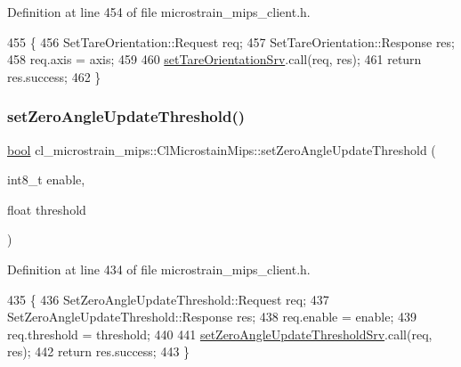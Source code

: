 Definition at line 454 of file microstrain\+\_\+mips\+\_\+client.\+h.


\begin{DoxyCode}
455     \{
456         SetTareOrientation::Request req;
457         SetTareOrientation::Response res;
458         req.axis = axis;
459 
460         \hyperlink{classcl__microstrain__mips_1_1ClMicrostainMips_affd28a64d0ee9bcdb116d974f5e19ec6}{setTareOrientationSrv}.call(req, res);
461         \textcolor{keywordflow}{return} res.success;
462     \}
\end{DoxyCode}
\mbox{\label{classcl__microstrain__mips_1_1ClMicrostainMips_a75ba5fe4116ece2f23f9f92f7ab96435}} 
\subsubsection{\texorpdfstring{set\+Zero\+Angle\+Update\+Threshold()}{setZeroAngleUpdateThreshold()}}
{\footnotesize\ttfamily \hyperlink{classbool}{bool} cl\+\_\+microstrain\+\_\+mips\+::\+Cl\+Microstain\+Mips\+::set\+Zero\+Angle\+Update\+Threshold (\begin{DoxyParamCaption}\item[{int8\+\_\+t}]{enable,  }\item[{float}]{threshold }\end{DoxyParamCaption})\hspace{0.3cm}{\ttfamily [inline]}}



Definition at line 434 of file microstrain\+\_\+mips\+\_\+client.\+h.


\begin{DoxyCode}
435     \{
436         SetZeroAngleUpdateThreshold::Request req;
437         SetZeroAngleUpdateThreshold::Response res;
438         req.enable = enable;
439         req.threshold = threshold;
440 
441         \hyperlink{classcl__microstrain__mips_1_1ClMicrostainMips_a88ffc1e573993764bb130c97cc64fe08}{setZeroAngleUpdateThresholdSrv}.call(req, res);
442         \textcolor{keywordflow}{return} res.success;
443     \}
\end{DoxyCode}


